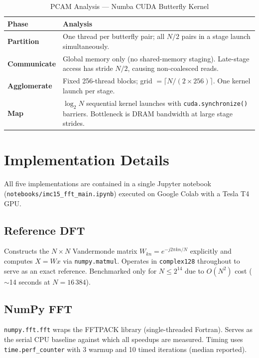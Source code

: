 \documentclass[12pt, letterpaper]{article}
\begin{document}
\begin{table}[H]
\centering
\caption{PCAM Analysis --- Numba CUDA Butterfly Kernel}
\begin{tabular}{@{}p{3cm}p{10cm}@{}}
\toprule
\textbf{Phase} & \textbf{Analysis} \\
\midrule
\textbf{Partition} & One thread per butterfly pair; all $N/2$ pairs in a stage launch simultaneously. \\
\textbf{Communicate} & Global memory only (no shared-memory staging). Late-stage access has stride $N/2$, causing non-coalesced reads. \\
\textbf{Agglomerate} & Fixed 256-thread blocks; grid $= \lceil N/(2 \times 256) \rceil$. One kernel launch per stage. \\
\textbf{Map} & $\log_2 N$ sequential kernel launches with \texttt{cuda.synchronize()} barriers. Bottleneck is DRAM bandwidth at large stage strides. \\
\bottomrule
\end{tabular}
\label{tab:pcam_numba}
\end{table}

\section{Implementation Details}
\label{sec:impl}

All five implementations are contained in a single Jupyter notebook (\texttt{notebooks/imc15\_fft\_main.ipynb}) executed on Google Colab with a Tesla T4 GPU.

\subsection{Reference DFT}

Constructs the $N \times N$ Vandermonde matrix $W_{kn} = e^{-j2\pi kn/N}$ explicitly and computes $X = W x$ via \texttt{numpy.matmul}. Operates in \texttt{complex128} throughout to serve as an exact reference. Benchmarked only for $N \leq 2^{14}$ due to $O(N^2)$ cost ($\sim$14 seconds at $N = 16\,384$).

\subsection{NumPy FFT}

\texttt{numpy.fft.fft} wraps the FFTPACK library (single-threaded Fortran). Serves as the serial CPU baseline against which all speedups are measured. Timing uses \texttt{time.perf\_counter} with 3 warmup and 10 timed iterations (median reported).
\end{document}
